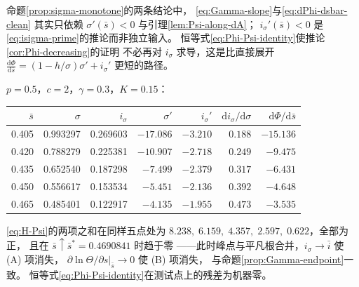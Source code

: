 \begin{remark}[对后续引用的说明]
\label{rem:only-sigma-needed}
命题\ref{prop:sigma-monotone}的两条结论中，
\eqref{eq:Gamma-slope}与\eqref{eq:dPhi-dsbar-clean}
其实只依赖 $\sigma'(\bar s)<0$ 与引理\ref{lem:Psi-along-dA}；
$i_\sigma'(\bar s)<0$ 是\eqref{eq:isigma-prime}的推论而非独立输入。
恒等式\eqref{eq:Phi-Psi-identity}使推论\ref{cor:Phi-decreasing}的证明
不必再对 $i_\sigma$ 求导，这是比直接展开
$\frac{\mathrm{d}\Phi}{\mathrm{d}\bar s}=(1-h/\sigma)\sigma'+i_\sigma'$ 更短的路径。
\end{remark}

\begin{remark}[基准参数下的数值]
\label{rem:mono-numeric}
$p=0.5$，$c=2$，$\gamma=0.3$，$K=0.15$：

\begin{center}
\begin{tabular}{@{}rrrrrrr@{}}
\hline
$\bar s$ & $\sigma$ & $i_\sigma$ & $\sigma'$ & $i_\sigma'$ &
$\mathrm{d}i_\sigma/\mathrm{d}\sigma$ & $\mathrm{d}\Phi/\mathrm{d}\bar s$\\
\hline
0.405 & 0.993297 & 0.269603 & $-17.086$ & $-3.210$ & $0.188$ & $-15.136$\\
0.420 & 0.788279 & 0.225381 & $-10.907$ & $-2.718$ & $0.249$ & $-9.475$\\
0.435 & 0.652540 & 0.187298 & $-7.499$  & $-2.379$ & $0.317$ & $-6.431$\\
0.450 & 0.556617 & 0.153534 & $-5.451$  & $-2.136$ & $0.392$ & $-4.648$\\
0.465 & 0.485401 & 0.122917 & $-4.135$  & $-1.955$ & $0.473$ & $-3.535$\\
\hline
\end{tabular}
\end{center}

\eqref{eq:H-Psi}的两项之和在同样五点处为
$8.238,\;6.159,\;4.357,\;2.597,\;0.622$，全部为正，
且在 $\bar s\uparrow\bar s^{*}=0.4690841$ 时趋于零
——此时峰点与平凡根合并，$i_\sigma\to\bar i$ 使 (A) 项消失，
$\partial\ln\Theta/\partial s|_{\bar s}\to0$ 使 (B) 项消失，
与命题\ref{prop:Gamma-endpoint}一致。
恒等式\eqref{eq:Phi-Psi-identity}在测试点上的残差为机器零。
\end{remark}

